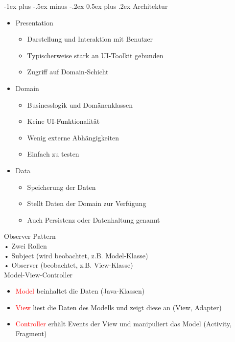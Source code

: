 \documentclass[10pt,landscape,a4paper]{article}
\makeatletter
\renewcommand{\section}{\@startsection{section}{1}{0mm}%
                                {-1ex plus -.5ex minus -.2ex}%
                                {0.5ex plus .2ex}%
                                {\normalfont\large\bfseries}}
\makeatother
\begin{document}
\begin{multicols*}{3}
\section{Architektur}
\begin{itemize}[leftmargin=*]
\item{Presentation}
\begin{itemize}[leftmargin=*]
\item{Darstellung und Interaktion mit Benutzer}
\item{Typischerweise stark an UI-Toolkit gebunden}
\item{Zugriff auf Domain-Schicht}
\end{itemize}
\item{Domain}
\begin{itemize}[leftmargin=*]
\item{Businesslogik und Domänenklassen}
\item{Keine UI-Funktionalität}
\item{Wenig externe Abhängigkeiten}
\item{Einfach zu testen}
\end{itemize}
\item{Data}
\begin{itemize}[leftmargin=*]
\item{Speicherung der Daten}
\item{Stellt Daten der Domain zur Verfügung}
\item{Auch Persistenz oder Datenhaltung genannt}
\end{itemize}
\end{itemize}
Observer Pattern\\
• Zwei Rollen\\
• Subject (wird beobachtet, z.B. Model-Klasse)\\
• Observer (beobachtet, z.B. View-Klasse)\\

Model-View-Controller
\begin{itemize}[leftmargin=*]
\item{\textcolor{red}{Model} beinhaltet die Daten (Java-Klassen)}
\item{\textcolor{red}{View} liest die Daten des Modells und zeigt diese an (View, Adapter)}
\item{\textcolor{red}{Controller} erhält Events der View und manipuliert das Model (Activity, Fragment)}


\end{itemize}
\end{multicols*}
\end{document}
